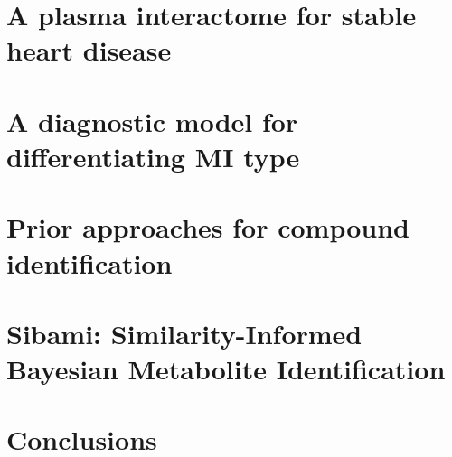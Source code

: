 \documentclass[final]{ulthesis}
\begin{document}
\chapter{A plasma interactome for stable heart disease}


\chapter{A diagnostic model for differentiating MI type}


\chapter{Prior approaches for compound identification}


\chapter{Sibami: Similarity-Informed Bayesian Metabolite Identification}


\chapter{Conclusions} 



\backmatter
\begin{DoubleSpace*}




%
%



\end{DoubleSpace*}
\end{document}
